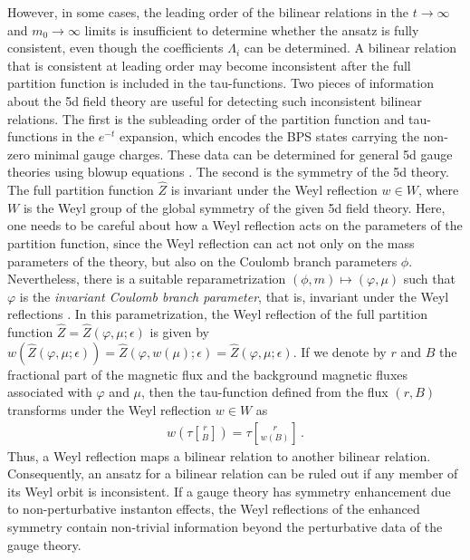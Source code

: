\documentclass[11pt, a4paper]{article}
\newcommand{\tauftn}[2]{\tau\genfrac[]{0pt}{1}{#1}{#2}}
\theoremstyle{definition}
\begin{document}
However, in some cases, the leading order of the bilinear relations in the $ t \to \infty $ and $ m_0 \to \infty $ limits is insufficient to determine whether the ansatz is fully consistent, even though the coefficients $ \Lambda_i $ can be determined. A bilinear relation that is consistent at leading order may become inconsistent after the full partition function is included in the tau-functions. Two pieces of information about the 5d field theory are useful for detecting such inconsistent bilinear relations. The first is the subleading order of the partition function and tau-functions in the $ e^{-t} $ expansion, which encodes the BPS states carrying the non-zero minimal gauge charges. These data can be determined for general 5d gauge theories using blowup equations \cite{Kim:2020hhh}. The second is the symmetry of the 5d theory. The full partition function $ \hat{Z} $ is invariant under the Weyl reflection $ w\in W $, where $ W $ is the Weyl group of the global symmetry of the given 5d field theory. Here, one needs to be careful about how a Weyl reflection acts on the parameters of the partition function, since the Weyl reflection can act not only on the mass parameters of the theory, but also on the Coulomb branch parameters $ \phi $. Nevertheless, there is a suitable reparametrization $ (\phi, m) \mapsto (\varphi, \mu) $ such that $ \varphi $ is the \emph{invariant Coulomb branch parameter}, that is, invariant under the Weyl reflections \cite{Hayashi:2019jvx}. In this parametrization, the Weyl reflection of the full partition function $ \hat{Z} = \hat{Z}(\varphi,\mu;\epsilon) $ is given by $ w(\hat{Z}(\varphi,\mu;\epsilon)) = \hat{Z}(\varphi, w(\mu);\epsilon) = \hat{Z}(\varphi,\mu;\epsilon) $. If we denote by $ r $ and $ B $ the fractional part of the magnetic flux and the background magnetic fluxes associated with $ \varphi $ and $ \mu $, then the tau-function defined from the flux $ (r,B) $ transforms under the Weyl reflection $ w \in W $ as
\begin{align}
    w(\tauftn{r}{B}) = \tauftn{r}{w(B)} \, .
\end{align}
Thus, a Weyl reflection maps a bilinear relation to another bilinear relation. Consequently, an ansatz for a bilinear relation can be ruled out if any member of its Weyl orbit is inconsistent. If a gauge theory has symmetry enhancement due to non-perturbative instanton effects, the Weyl reflections of the enhanced symmetry contain non-trivial information beyond the perturbative data of the gauge theory.
\end{document}
